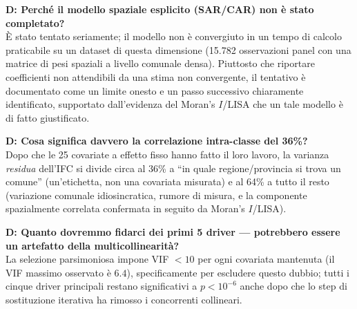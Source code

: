 \documentclass[11pt,a4paper]{article}
\begin{document}
\textbf{D: Perché il modello spaziale esplicito (SAR/CAR) non è
stato completato?}\\
È stato tentato seriamente; il modello non è convergiuto in un tempo
di calcolo praticabile su un dataset di questa dimensione
(15{.}782 osservazioni panel con una matrice di pesi spaziali a
livello comunale densa). Piuttosto che riportare coefficienti non
attendibili da una stima non convergente, il tentativo è documentato
come un limite onesto e un passo successivo chiaramente
identificato, supportato dall'evidenza del Moran's $I$/LISA che un
tale modello è di fatto giustificato.

\textbf{D: Cosa significa davvero la correlazione intra-classe del
36\%?}\\
Dopo che le 25 covariate a effetto fisso hanno fatto il loro lavoro,
la varianza \emph{residua} dell'IFC si divide circa al 36\% a ``in
quale regione/provincia si trova un comune'' (un'etichetta, non una
covariata misurata) e al 64\% a tutto il resto (variazione comunale
idiosincratica, rumore di misura, e la componente spazialmente
correlata confermata in seguito da Moran's $I$/LISA).

\textbf{D: Quanto dovremmo fidarci dei primi 5 driver --- potrebbero
essere un artefatto della multicollinearità?}\\
La selezione parsimoniosa impone VIF $<10$ per ogni covariata
mantenuta (il VIF massimo osservato è $6.4$), specificamente per
escludere questo dubbio; tutti i cinque driver principali restano
significativi a $p<10^{-6}$ anche dopo che lo step di sostituzione
iterativa ha rimosso i concorrenti collineari.
\end{document}
